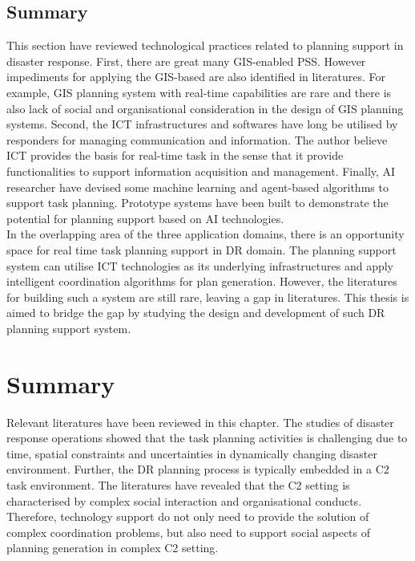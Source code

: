 \subsection{Summary}
This section have reviewed technological practices related to planning support in disaster response. First, there are great many \ac{GIS}-enabled \acf{PSS}. However impediments for applying the \ac{GIS}-based are also identified in literatures. For example, \ac{GIS} planning system with real-time capabilities are rare and there is also lack of social and organisational consideration in the design of \ac{GIS} planning systems. Second, the \ac{ICT} infrastructures and softwares have long be utilised by responders for managing communication and information. The author believe \ac{ICT} provides the basis for real-time task in the sense that it provide functionalities to support information acquisition and management. Finally, \ac{AI} researcher have devised some machine learning and agent-based algorithms to support task planning. Prototype systems have been built to demonstrate the potential for planning support based on \ac{AI} technologies.\\ 

In the overlapping area of the three application domains, there is an opportunity space for real time task planning support in \ac{DR} domain. The planning support system can utilise \ac{ICT} technologies as its underlying infrastructures and apply intelligent coordination algorithms for plan generation. However, the literatures for building such a system are still rare, leaving a gap in literatures. This thesis is aimed to bridge the gap by studying the design and development of such \ac{DR} planning support system.\\

\section{Summary}
Relevant literatures have been reviewed in this chapter. The studies of disaster response operations showed that the task planning activities is challenging due to time, spatial constraints and uncertainties in dynamically changing disaster environment. Further, the \ac{DR} planning process is typically embedded in a \acf{C2} task environment. The literatures have revealed that the \ac{C2} setting is characterised by complex social interaction and organisational conducts. Therefore, technology support do not only need to provide the solution of complex coordination problems, but also need to support social aspects of planning generation in complex \ac{C2} setting. \\


